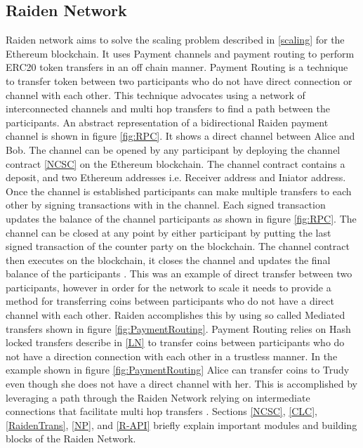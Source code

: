 \subsection{Raiden Network} \label{raiden} 
Raiden network aims to solve the scaling problem described in \ref{scaling} for the Ethereum blockchain. It uses Payment channels and payment routing to perform ERC20 token transfers in an off chain manner.  Payment Routing is a technique to transfer token between two participants who do not have direct connection or channel with each other. This technique advocates using a network of interconnected channels and multi hop transfers to find a path between the participants. An abstract representation of a bidirectional Raiden payment channel is shown in figure \ref{fig:RPC}. It shows a direct channel between Alice and Bob. The channel can be opened by any participant by deploying the channel contract \ref{NCSC} on the Ethereum blockchain. The channel contract contains a deposit, and two Ethereum addresses i.e. Receiver address and Iniator address. Once the channel is established participants can make multiple transfers to each other by signing transactions with in the channel. Each signed transaction updates the balance of the channel participants as shown in figure \ref{fig:RPC}. The channel can be closed at any point by either participant by putting the last signed transaction of the counter party on the blockchain. The channel contract then executes on the blockchain, it closes the channel and updates the final balance of the participants \cite{rad:001}. This was an example of direct transfer between two participants, however in order for the network to scale it needs to provide a method for transferring coins between participants who do not have a direct channel with each other. Raiden accomplishes this by using so called Mediated transfers shown in figure \ref{fig:PaymentRouting}. Payment Routing relies on Hash locked transfers describe in \ref{LN} to transfer coins between participants who do not have a direction connection with each other in a trustless manner. In the example shown in figure \ref{fig:PaymentRouting} Alice can transfer coins to Trudy even though she does not have a direct channel with her. This is accomplished by leveraging a path through the Raiden Network relying on intermediate connections that facilitate multi hop transfers \cite{rad:001}.  Sections \ref{NCSC}, \ref{CLC}, \ref{RaidenTrans}, \ref{NP}, and \ref{R-API} briefly explain important modules and building blocks of the Raiden Network.

